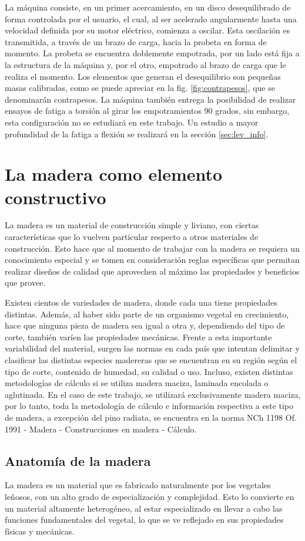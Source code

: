La máquina consiste, en un primer acercamiento, en un disco desequilibrado de forma controlada por el usuario, el cual, al ser acelerado angularmente hasta una velocidad definida por su motor eléctrico, comienza a oscilar. Esta oscilación es transmitida, a través de un brazo de carga, hacia la probeta en forma de momento. La probeta se encuentra doblemente empotrada, por un lado está fija a la estructura de la máquina y, por el otro, empotrado al brazo de carga que le realiza el momento. Los elementos que generan el desequilibrio son pequeñas masas calibradas, como se puede apreciar en la fig. \ref{fig:contrapesos}, que se denominarán contrapesos. La máquina también entrega la posibilidad de realizar ensayos de fatiga a torsión al girar los empotramientos 90 grados, sin embargo, esta configuración no se estudiará en este trabajo. Un estudio a mayor profundidad de la fatiga a flexión se realizará en la sección \ref{sec:lev_info}.

\section{La madera como elemento constructivo}
La madera es un material de construcción simple y liviano, con ciertas características que lo vuelven particular respecto a otros materiales de construcción. Esto hace que al momento de trabajar con la madera se requiera un conocimiento especial y se tomen en consideración reglas específicas que permitan realizar diseños de calidad que aprovechen al máximo las propiedades y beneficios que provee.

Existen cientos de variedades de madera, donde cada una tiene propiedades distintas. Además, al haber sido parte de un organismo vegetal en crecimiento, hace que ninguna pieza de madera sea igual a otra y, dependiendo del tipo de corte, también varíen las propiedades mecánicas. Frente a esta importante variabilidad del material, surgen las normas en cada país que intentan delimitar y clasificar las distintas especies madereras que se encuentran en su región según el tipo de corte, contenido de humedad, su calidad o uso. Incluso, existen distintas metodologías de cálculo si se utiliza madera maciza, laminada encolada o aglutinada. En el caso de este trabajo, se utilizará exclusivamente madera maciza, por lo tanto, toda la metodología de cálculo e información respectiva a este tipo de madera, a excepción del pino radiata, se encuentra en la norma NCh 1198 Of. 1991 - Madera - Construcciones en madera - Cálculo.

\subsection{Anatomía de la madera}
La madera es un material que es fabricado naturalmente por los vegetales leñosos, con un alto grado de especialización y complejidad. Esto lo convierte en un material altamente heterogéneo, al estar especializado en llevar a cabo las funciones fundamentales del vegetal, lo que se ve reflejado en sus propiedades físicas y mecánicas. 

